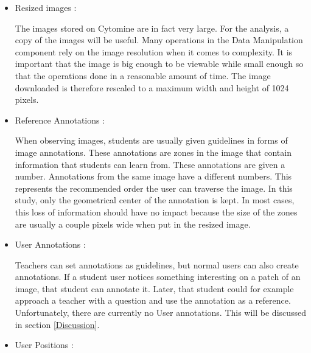 \documentclass[a4paper,11pt]{report}
\numberwithin{figure}{section} %
\begin{document}
          \begin{itemize}
          \item[\textbullet] Resized images :\newline
          
          The images stored on Cytomine are in fact very large. For the analysis, a copy of the images will be useful. Many operations in the Data Manipulation component rely on the image resolution when it comes to complexity. It is important that the image is big enough to be viewable while small enough so that the operations done in a reasonable amount of time. The image downloaded is therefore rescaled to a maximum width and height of 1024 pixels.\\
          \item[\textbullet] Reference Annotations :\newline
          
          When observing images, students are usually given guidelines in forms of image annotations. These annotations are zones in the image that contain information that students can learn from. These annotations are given a number. Annotations from the same image have a different numbers. This represents the recommended order the user can traverse the image. In this study, only the geometrical center of the annotation is kept. In most cases, this loss of information should have no impact because the size of the zones are usually a couple pixels wide when put in the resized image.\\
		\item[\textbullet]  User Annotations :\newline
        
        Teachers can set annotations as guidelines, but normal users can also create annotations. If a student user notices something interesting on a patch of an image, that student can annotate it. Later, that student could for example approach a teacher with a question and use the annotation as a reference. Unfortunately, there are currently no User annotations. This will be discussed in section \ref{Discussion}.\\
        
        \item[\textbullet]  User Positions :\newline
        

\end{itemize}
\end{document}
